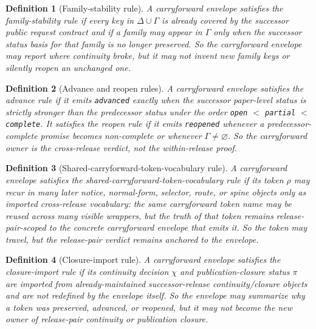 \documentclass[11pt]{article}
\newtheorem{definition}{Definition}
\begin{document}
\begin{definition}[Family-stability rule]
A carryforward envelope satisfies the \emph{family-stability rule} if every key in $\Delta\cup\Gamma$ is already covered by the successor public request contract and if a family may appear in $\Gamma$ only when the successor status basis for that family is no longer preserved.
So the carryforward envelope may report where continuity broke, but it may not invent new family keys or silently reopen an unchanged one.
\end{definition}

\begin{definition}[Advance and reopen rules]
A carryforward envelope satisfies the \emph{advance rule} if it emits \texttt{advanced} exactly when the successor paper-level status is strictly stronger than the predecessor status under the order \texttt{open} $<$ \texttt{partial} $<$ \texttt{complete}.
It satisfies the \emph{reopen rule} if it emits \texttt{reopened} whenever a predecessor-complete promise becomes non-complete or whenever $\Gamma\neq\varnothing$.
So the carryforward owner is the cross-release verdict, not the within-release proof.
\end{definition}

\begin{definition}[Shared-carryforward-token-vocabulary rule]
A carryforward envelope satisfies the \emph{shared-carryforward-token-vocabulary rule} if its token $\rho$ may recur in many later notice, normal-form, selector, route, or spine objects only as imported cross-release vocabulary: the same carryforward token name may be reused across many visible wrappers, but the truth of that token remains release-pair-scoped to the concrete carryforward envelope that emits it.
So the token may travel, but the release-pair verdict remains anchored to the envelope.
\end{definition}

\begin{definition}[Closure-import rule]
A carryforward envelope satisfies the \emph{closure-import rule} if its continuity decision $\chi$ and publication-closure status $\pi$ are imported from already-maintained successor-release continuity/closure objects and are not redefined by the envelope itself.
So the envelope may summarize why a token was preserved, advanced, or reopened, but it may not become the new owner of release-pair continuity or publication closure.
\end{definition}
\end{document}
